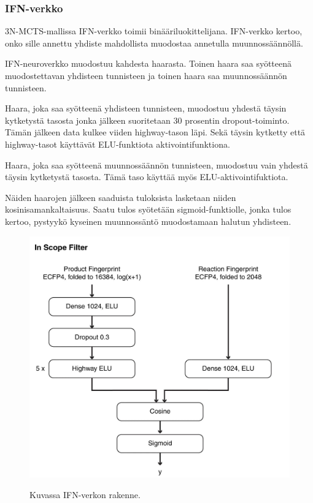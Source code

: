 \documentclass[finnish,twoside,censored,tkt,sw-line]{HYthesisML}
\begin{document}
\subsubsection{IFN-verkko}

3N-MCTS-mallissa IFN-verkko toimii binääriluokittelijana.
IFN-verkko kertoo, onko sille annettu yhdiste mahdollista muodostaa annetulla muunnossäännöllä.

IFN-neuroverkko muodostuu kahdesta haarasta.
Toinen haara saa syötteenä muodostettavan yhdisteen tunnisteen ja toinen haara saa muunnossäännön tunnisteen.

Haara, joka saa syötteenä yhdisteen tunnisteen, muodostuu yhdestä täysin kytketystä tasosta jonka jälkeen suoritetaan 30 prosentin dropout-toiminto.
Tämän jälkeen data kulkee viiden highway-tason läpi.
Sekä täysin kytketty että highway-tasot käyttävät ELU-funktiota aktivointifunktiona.

Haara, joka saa syötteenä muunnossäännön tunnisteen, muodostuu vain yhdestä täysin kytketystä tasosta.
Tämä taso käyttää myös ELU-aktivointifuktiota.

Näiden haarojen jälkeen saaduista tuloksista lasketaan niiden kosinisamankaltaisuus.
Saatu tulos syötetään sigmoid-funktiolle, jonka tulos kertoo, pystyykö kyseinen muunnossäntö muodostamaan halutun yhdisteen.

\begin{figure}[!ht]
    \centering
    \includegraphics[]{in-scope-filter.jpg}
    \caption{Kuvassa IFN-verkon rakenne.}
    {\cite{SeglerMarwinHS2018Pcsw}}
    {\label{fig:3n-mcts-ifn}}
\end{figure}
\end{document}
